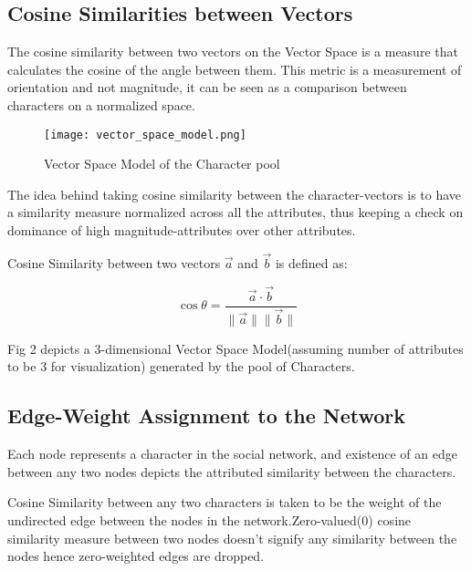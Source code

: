 \documentclass[conference]{IEEEtran}
\begin{document}
\subsection{Cosine Similarities between Vectors}
The cosine similarity between two vectors on the Vector Space is a measure that calculates the cosine of the angle between them. This metric is a measurement of orientation and not magnitude, it can be seen as a comparison between characters on a normalized space.

\begin{figure}
    \centering
    \texttt{[image: vector\_space\_model.png]}
    \caption{Vector Space Model of the Character pool}
    \label{fig:2}
\end{figure}

The idea behind taking cosine similarity between the character-vectors is to have a similarity measure normalized across all the attributes, thus keeping a check on dominance of high magnitude-attributes over other attributes. 

Cosine Similarity between two vectors $\vec{a}$ and $\vec{b}$ is defined as:

\begin{equation}
    \cos{\theta} = \frac{\vec{a} \cdot \vec{b}}{\|\vec{a}\|\|\vec{b}\|}
\end{equation}

Fig 2 depicts a 3-dimensional Vector Space Model(assuming number of attributes to be 3 for visualization) generated by the pool of Characters.

\subsection{Edge-Weight Assignment to the Network }

Each node represents a character in the social network, and existence of an edge between any two nodes depicts the attributed similarity between the characters.

Cosine Similarity between any two characters is taken to be the weight of the undirected edge between the nodes in the network.Zero-valued(0) cosine similarity measure between two nodes doesn't signify any similarity between the nodes hence zero-weighted edges are dropped.

\end{document}
